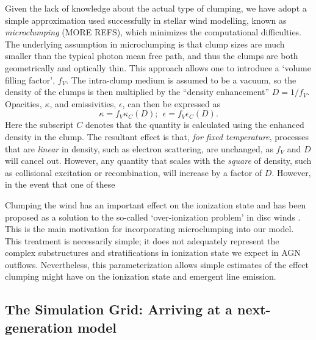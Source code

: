 \documentclass[useAMS,usenatbib]{mn2e_x}
\begin{document}
Given the lack of knowledge about the actual type of clumping, we have adopt a simple approximation
used successfully in stellar wind modelling, known as 
{\em microclumping} \citep{hamann1998,hamann2008}(MORE REFS), 
which minimizes the computational difficulties. 
The underlying assumption in microclumping is that clump sizes are much smaller than the 
typical photon mean free path, and thus the clumps are 
both geometrically and optically thin. This approach 
allows one to introduce a `volume filling factor', $f_V$. 
The intra-clump medium is assumed to be a vacuum, so the 
density of the clumps is then multiplied by the ``density enhancement'' 
$D=1/f_V$. Opacities, $\kappa$, and emissivities, $\epsilon$, 
can then be expressed as 
\begin{equation}
\kappa = f_V \kappa_C(D);~~\epsilon = f_V \epsilon_C(D).
\end{equation}
Here the subscript $C$ denotes that the quantity is calculated using the 
enhanced density in the clump. The resultant effect is that, {\em for fixed temperature},
 processes that are {\em linear} in density, such as electron scattering, are unchanged, 
as $f_V$ and $D$ will cancel out. However, any quantity that scales with the {\em square} of density, 
such as collisional excitation or recombination, will increase by a factor of $D$.
However, in the event that one of these 


Clumping the wind has an important effect on the ionization state and has
been proposed as a solution to the so-called `over-ionization problem' in 
disc winds \citep{hamann2013}. This is the main motivation for incorporating microclumping
into our model. This treatment is necessarily simple; it does not adequately
represent the complex substructures and stratifications in ionization
state we expect in AGN outflows. Nevertheless,  this parameterization allows simple estimates
of the effect clumping might have on the ionization state and emergent 
line emission. 

\subsection{The Simulation Grid: Arriving at a next-generation model}
\end{document}
